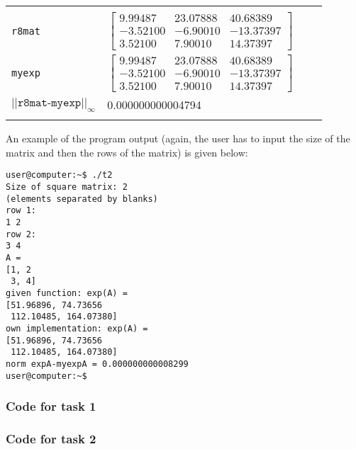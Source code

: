 \documentclass[a4paper,10pt]{article}
\begin{document}
\begin{table}[!ht]
\begin{tabular}{l l l l l l}
    \hline \\ 
    \texttt{r8mat}	& 
    \multicolumn{3}{l}{
    $\left[
      \begin{array}{cccc}
	9.99487 &  23.07888 & 40.68389 \\
	 -3.52100 & -6.90010 & -13.37397 \\
	  3.52100 &  7.90010 & 14.37397
      \end{array}
    \right]$ } \vspace{2mm} \\
    \texttt{myexp}	& 
    \multicolumn{3}{l}{
    $\left[
      \begin{array}{cccc}
	9.99487 &  23.07888 & 40.68389 \\
	 -3.52100 & -6.90010 & -13.37397 \\
	  3.52100 &  7.90010 & 14.37397
      \end{array}
    \right]$} \vspace{2mm} \\
    $||\texttt{r8mat-myexp}||_\infty$ & 0.000000000004794  \\
    \vspace{-2mm} \\ \hline

\end{tabular}
\end{table}

\FloatBarrier



\noindent
An example of the program output (again, the user has to input the size of the matrix and then the rows of the matrix) is given below:
\begin{center}
\begin{minipage}[t]{85mm}
\begin{lstlisting}
user@computer:~$ ./t2 
Size of square matrix: 2
(elements separated by blanks)
row 1:
1 2
row 2:
3 4
A = 
[1, 2
 3, 4]
given function: exp(A) = 
[51.96896, 74.73656
 112.10485, 164.07380]
own implementation: exp(A) = 
[51.96896, 74.73656
 112.10485, 164.07380]
norm expA-myexpA = 0.000000000008299
user@computer:~$ 
\end{lstlisting}
\end{minipage}
\end{center}


\newpage
\subsubsection*{Code for task 1}



\newpage
\subsubsection*{Code for task 2}


\end{document}
